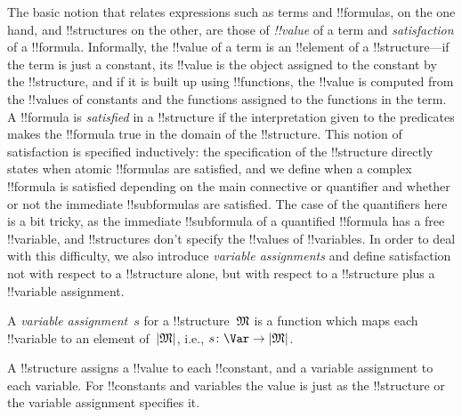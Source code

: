 \documentclass[../../../include/open-logic-section]{subfiles}
\begin{document}


\begin{explain}
The basic notion that relates expressions such as terms and
!!{formula}s, on the one hand, and !!{structure}s on the other, are
those of \emph{!!{value}} of a term and \emph{satisfaction} of a
!!{formula}.  Informally, the !!{value} of a term is an !!{element} of
a !!{structure}---if the term is just a constant, its !!{value} is the
object assigned to the constant by the !!{structure}, and if it is
built up using !!{function}s, the !!{value} is computed from the
!!{value}s of constants and the functions assigned to the functions in
the term.  A !!{formula} is \emph{satisfied} in a !!{structure} if the
interpretation given to the predicates makes the !!{formula} true in
the domain of the !!{structure}. This notion of satisfaction is
specified inductively: the specification of the !!{structure} directly
states when atomic !!{formula}s are satisfied, and we define when a
complex !!{formula} is satisfied depending on the main connective or
quantifier and whether or not the immediate !!{subformula}s are
satisfied. The case of the quantifiers here is a bit tricky, as the
immediate !!{subformula} of a quantified !!{formula} has a free
!!{variable}, and !!{structure}s don't specify the !!{value}s of
!!{variable}s.  In order to deal with this difficulty, we also
introduce \emph{variable assignments} and define satisfaction not with
respect to a !!{structure} alone, but with respect to a !!{structure}
plus a !!{variable} assignment.
\end{explain}

\begin{defn}
A \emph{variable assignment}~$s$ for a !!{structure}~$\Struct{M}$ is a
function which maps each !!{variable} to an element of~$\Domain M$,
i.e., $s\colon \Var \to \Domain M$.
\end{defn}

\begin{explain}
A !!{structure} assigns a !!{value} to each !!{constant}, and a
variable assignment to each variable. For !!{constant}s and
variables the value is just as the !!{structure} or the variable
assignment specifies it.
\end{explain}
\end{document}
